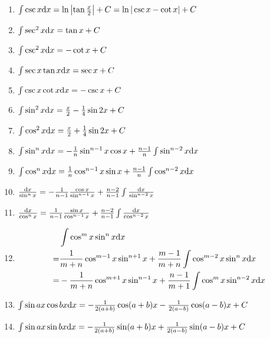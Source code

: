 \begin{tiny}
\begin{enumerate}
\item $ \int \csc x \mathrm{d} x = \ln \left| \tan\frac{x}{2} \right| + C = \ln |\csc x - \cot x| + C $

\item $ \int \sec^2 x \mathrm{d} x = \tan x + C $

\item $ \int \csc^2 x \mathrm{d} x = -\cot x + C $

\item $ \int \sec x \tan x \mathrm{d} x = \sec x + C $

\item $ \int \csc x \cot x \mathrm{d} x = -\csc x + C $

\item $ \int \sin^2 x \mathrm{d} x = \frac{x}{2} - \frac{1}{4} \sin 2x + C $

\item $ \int \cos^2 x \mathrm{d} x = \frac{x}{2} + \frac{1}{4} \sin 2x + C $

\item $ \int \sin^n x \mathrm{d} x = -\frac{1}{n} \sin^{n-1} x \cos x + \frac{n-1}{n} \int \sin^{n-2} x \mathrm{d} x $

\item $ \int \cos^n x \mathrm{d} x = \frac{1}{n} \cos^{n-1} x \sin x + \frac{n-1}{n} \int \cos^{n-2} x \mathrm{d} x $

\item $ \frac{\mathrm{d} x}{\sin^n x} = -\frac{1}{n-1} \frac{\cos x}{\sin^{n-1}x} + \frac{n-2}{n-1} \int \frac{\mathrm{d} x}{\sin^{n-2}x} $

\item $ \frac{\mathrm{d} x}{\cos^n x} = \frac{1}{n-1} \frac{\sin x}{\cos^{n-1}x} + \frac{n-2}{n-1} \int \frac{\mathrm{d} x}{\cos^{n-2}x} $

\item \[ \begin{split} {} & \int \cos^m x \sin^n x \mathrm{d} x \\
	= & \frac{1}{m+n} \cos^{m-1} x \sin^{n+1}x + \frac{m-1}{m+n}\int\cos^{m-2}x\sin^nx\mathrm{d} x \\
	= & -\frac{1}{m+n} \cos^{m+1} x \sin^{n-1}x + \frac{n-1}{m+1} \int \cos^m x\sin^{n-2} x \mathrm{d} x \end{split} \]

\item $ \int \sin ax \cos bx \mathrm{d} x = -\frac{1}{2(a+b)}\cos(a+b)x - \frac{1}{2(a-b)}\cos(a-b)x + C $

\item $ \int \sin ax \sin bx \mathrm{d} x = -\frac{1}{2(a+b)}\sin(a+b)x + \frac{1}{2(a-b)}\sin(a-b)x + C $


\end{enumerate}
\end{tiny}

